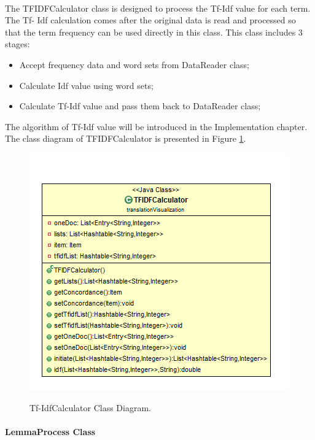 \paragraph[]{}
The TFIDFCalculator class is designed to process the Tf-Idf value for each term. The Tf- Idf calculation comes after the original data is read and processed so that the term frequency can be used directly in this class. This class includes 3 stages:
\begin{itemize}
	\item \textbf{}Accept frequency data and word sets from DataReader class;
	\item \textbf{}Calculate Idf value using word sets;
	\item \textbf{}Calculate Tf-Idf value and pass them back to DataReader class;
\end{itemize} 
The algorithm of Tf-Idf value will be introduced in the Implementation chapter. The class diagram of TFIDFCalculator is presented in Figure \ref{fig:tfIdfCalc}.

\begin{figure}[H]
	\centering    
	\includegraphics[scale=0.9]{Figs/Tf-IdfCalculator}\\[1ex]
	\caption{Tf-IdfCalculator Class Diagram. }
	\label{fig:tfIdfCalc}
\end{figure}

\paragraph{LemmaProcess Class}

